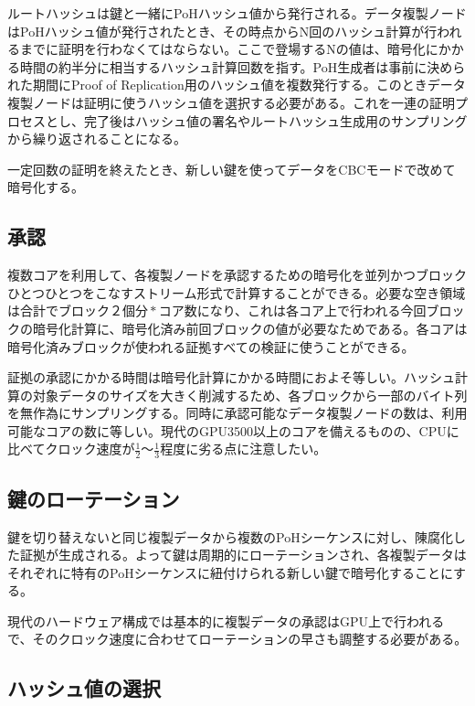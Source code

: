 \documentclass[12pt]{ltjsarticle}
\begin{document}
ルートハッシュは鍵と一緒にPoHハッシュ値から発行される。データ複製ノードはPoHハッシュ値が発行されたとき、その時点からN回のハッシュ計算が行われるまでに証明を行わなくてはならない。ここで登場するNの値は、暗号化にかかる時間の約半分に相当するハッシュ計算回数を指す。PoH生成者は事前に決められた期間にProof of Replication用のハッシュ値を複数発行する。このときデータ複製ノードは証明に使うハッシュ値を選択する必要がある。これを一連の証明プロセスとし、完了後はハッシュ値の署名やルートハッシュ生成用のサンプリングから繰り返されることになる。

一定回数の証明を終えたとき、新しい鍵を使ってデータをCBCモードで改めて暗号化する。

\subsection{承認}

複数コアを利用して、各複製ノードを承認するための暗号化を並列かつブロックひとつひとつをこなすストリーム形式で計算することができる。必要な空き領域は合計で\(ブロック２個分 * コア数\)になり、これは各コア上で行われる今回ブロックの暗号化計算に、暗号化済み前回ブロックの値が必要なためである。各コアは暗号化済みブロックが使われる証拠すべての検証に使うことができる。

証拠の承認にかかる時間は暗号化計算にかかる時間におよそ等しい。ハッシュ計算の対象データのサイズを大きく削減するため、各ブロックから一部のバイト列を無作為にサンプリングする。同時に承認可能なデータ複製ノードの数は、利用可能なコアの数に等しい。現代のGPU3500以上のコアを備えるものの、CPUに比べてクロック速度が\(\frac{1}{2}\)〜\(\frac{1}{3}\)程度に劣る点に注意したい。

\subsection{鍵のローテーション}

鍵を切り替えないと同じ複製データから複数のPoHシーケンスに対し、陳腐化した証拠が生成される。よって鍵は周期的にローテーションされ、各複製データはそれぞれに特有のPoHシーケンスに紐付けられる新しい鍵で暗号化することにする。

現代のハードウェア構成では基本的に複製データの承認はGPU上で行われるで、そのクロック速度に合わせてローテーションの早さも調整する必要がある。

\subsection{ハッシュ値の選択}\label{hashselection}
\end{document}
